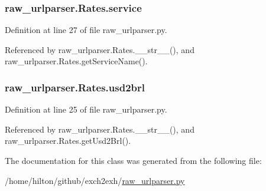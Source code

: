 \hypertarget{classraw__urlparser_1_1_rates_acb05316e95a39bc42590a882712f854b}{
\subsubsection[{service}]{\setlength{\rightskip}{0pt plus 5cm}raw\-\_\-urlparser.\-Rates.\-service}}\label{classraw__urlparser_1_1_rates_acb05316e95a39bc42590a882712f854b}


Definition at line 27 of file raw\-\_\-urlparser.\-py.



Referenced by raw\-\_\-urlparser.\-Rates.\-\_\-\-\_\-str\-\_\-\-\_\-(), and raw\-\_\-urlparser.\-Rates.\-get\-Service\-Name().

\hypertarget{classraw__urlparser_1_1_rates_a52d9b688be8385a87783b27839749b4a}{
\subsubsection[{usd2brl}]{\setlength{\rightskip}{0pt plus 5cm}raw\-\_\-urlparser.\-Rates.\-usd2brl}}\label{classraw__urlparser_1_1_rates_a52d9b688be8385a87783b27839749b4a}


Definition at line 25 of file raw\-\_\-urlparser.\-py.



Referenced by raw\-\_\-urlparser.\-Rates.\-\_\-\-\_\-str\-\_\-\-\_\-(), and raw\-\_\-urlparser.\-Rates.\-get\-Usd2\-Brl().



The documentation for this class was generated from the following file\-:\begin{DoxyCompactItemize}
\item 
/home/hilton/github/exch2exh/\hyperlink{raw__urlparser_8py}{raw\-\_\-urlparser.\-py}\end{DoxyCompactItemize}
